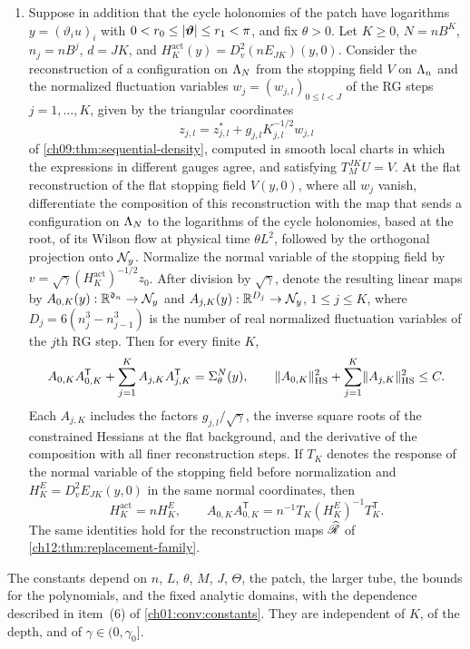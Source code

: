 \begin{proposition}
\begin{enumerate}
\item Suppose in addition that the cycle holonomies of the patch have logarithms $y=(\vartheta_iu)_i$ with $0<r_0\le\lvert \bm\vartheta\rvert\le r_1<\pi$, and fix $\theta>0$. Let $K\ge0$, $N=nB^K$, $n_j=nB^j$, $d=JK$, and $H_K^{\mathrm{act}}(y)=D_v^2(nE_{JK})(y,0)$. Consider the reconstruction of a configuration on $\Lambda_{N}$ from the stopping field $V$ on $\Lambda_{n}$ and the normalized fluctuation variables $w_j=(w_{j,l})_{0\le l<J}$ of the RG steps $j=1,\dots,K$, given by the triangular coordinates
\[
 z_{j,l}=z_{j,l}^*+g_{j,l}K_{j,l}^{-1/2}w_{j,l}
\]
of \cref{ch09:thm:sequential-density}, computed in smooth local charts in which the expressions in different gauges agree, and satisfying $T_M^{JK}U=V$. At the flat reconstruction of the flat stopping field $V(y,0)$, where all $w_j$ vanish, differentiate the composition of this reconstruction with the map that sends a configuration on $\Lambda_{N}$ to the logarithms of the cycle holonomies, based at the root, of its Wilson flow at physical time $\theta L^2$, followed by the orthogonal projection onto $\mathcal N_{y}$. Normalize the normal variable of the stopping field by $v=\sqrt\gamma(H_K^{\mathrm{act}})^{-1/2}z_0$. After division by $\sqrt\gamma$, denote the resulting linear maps by $A_{0,K}(y):\mathbb R^{\mathfrak d_n}\to\mathcal N_{y}$ and $A_{j,K}(y):\mathbb R^{D_j}\to\mathcal N_{y}$, $1\le j\le K$, where $D_j=6(n_j^3-n_{j-1}^3)$ is the number of real normalized fluctuation variables of the $j$th RG step. Then for every finite $K$,
\[
 A_{0,K}A_{0,K}^{\mathsf T}+\sum_{j=1}^KA_{j,K}A_{j,K}^{\mathsf T}=\Sigma_\theta^N(y),\qquad\lVert A_{0,K}\rVert_{\mathrm{HS}}^2+\sum_{j=1}^K\lVert A_{j,K}\rVert_{\mathrm{HS}}^2\le C.
\]
Each $A_{j,K}$ includes the factors $g_{j,l}/\sqrt\gamma$, the inverse square roots of the constrained Hessians at the flat background, and the derivative of the composition with all finer reconstruction steps. If $T_K$ denotes the response of the normal variable of the stopping field before normalization and $H_K^E=D_v^2E_{JK}(y,0)$ in the same normal coordinates, then
\[
 H_K^{\mathrm{act}}=nH_K^E,\qquad A_{0,K}A_{0,K}^{\mathsf T}=n^{-1}T_K(H_K^E)^{-1}T_K^{\mathsf T}.
\]
The same identities hold for the reconstruction maps $\widehat{\mathscr R}$ of \cref{ch12:thm:replacement-family}.
\end{enumerate}
The constants depend on $n$, $L$, $\theta$, $M$, $J$, $\Theta$, the patch, the larger tube, the bounds for the polynomials, and the fixed analytic domains, with the dependence described in item~(6) of \cref{ch01:conv:constants}. They are independent of $K$, of the depth, and of $\gamma\in(0,\gamma_0]$.
\end{proposition}

